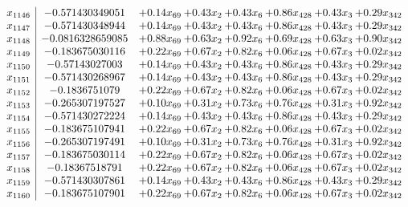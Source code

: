 \documentclass[8pt]{article}
\begin{document}
\[\begin{array}{c| c c@{\hskip 2pt} c@{\hskip 2pt} c@{\hskip 2pt} c@{\hskip 2pt} c@{\hskip 2pt} c@{\hskip 2pt} }
 x_{1146}   &  -0.571430349051 & +  0.14 x_{69} & +  0.43 x_{2} & +  0.43 x_{6} & +  0.86 x_{428} & +  0.43 x_{3} & +  0.29 x_{342}\\
 x_{1147}   &  -0.571430348944 & +  0.14 x_{69} & +  0.43 x_{2} & +  0.43 x_{6} & +  0.86 x_{428} & +  0.43 x_{3} & +  0.29 x_{342}\\
 x_{1148}   &  -0.0816328659085 & +  0.88 x_{69} & +  0.63 x_{2} & +  0.92 x_{6} & +  0.69 x_{428} & +  0.63 x_{3} & +  0.90 x_{342}\\
 x_{1149}   &  -0.183675030116 & +  0.22 x_{69} & +  0.67 x_{2} & +  0.82 x_{6} & +  0.06 x_{428} & +  0.67 x_{3} & +  0.02 x_{342}\\
 x_{1150}   &  -0.57143027003 & +  0.14 x_{69} & +  0.43 x_{2} & +  0.43 x_{6} & +  0.86 x_{428} & +  0.43 x_{3} & +  0.29 x_{342}\\
 x_{1151}   &  -0.571430268967 & +  0.14 x_{69} & +  0.43 x_{2} & +  0.43 x_{6} & +  0.86 x_{428} & +  0.43 x_{3} & +  0.29 x_{342}\\
 x_{1152}   &  -0.1836751079 & +  0.22 x_{69} & +  0.67 x_{2} & +  0.82 x_{6} & +  0.06 x_{428} & +  0.67 x_{3} & +  0.02 x_{342}\\
 x_{1153}   &  -0.265307197527 & +  0.10 x_{69} & +  0.31 x_{2} & +  0.73 x_{6} & +  0.76 x_{428} & +  0.31 x_{3} & +  0.92 x_{342}\\
 x_{1154}   &  -0.571430272224 & +  0.14 x_{69} & +  0.43 x_{2} & +  0.43 x_{6} & +  0.86 x_{428} & +  0.43 x_{3} & +  0.29 x_{342}\\
 x_{1155}   &  -0.183675107941 & +  0.22 x_{69} & +  0.67 x_{2} & +  0.82 x_{6} & +  0.06 x_{428} & +  0.67 x_{3} & +  0.02 x_{342}\\
 x_{1156}   &  -0.265307197491 & +  0.10 x_{69} & +  0.31 x_{2} & +  0.73 x_{6} & +  0.76 x_{428} & +  0.31 x_{3} & +  0.92 x_{342}\\
 x_{1157}   &  -0.183675030114 & +  0.22 x_{69} & +  0.67 x_{2} & +  0.82 x_{6} & +  0.06 x_{428} & +  0.67 x_{3} & +  0.02 x_{342}\\
 x_{1158}   &  -0.18367518791 & +  0.22 x_{69} & +  0.67 x_{2} & +  0.82 x_{6} & +  0.06 x_{428} & +  0.67 x_{3} & +  0.02 x_{342}\\
 x_{1159}   &  -0.571430307861 & +  0.14 x_{69} & +  0.43 x_{2} & +  0.43 x_{6} & +  0.86 x_{428} & +  0.43 x_{3} & +  0.29 x_{342}\\
 x_{1160}   &  -0.183675107901 & +  0.22 x_{69} & +  0.67 x_{2} & +  0.82 x_{6} & +  0.06 x_{428} & +  0.67 x_{3} & +  0.02 x_{342}\\

\end{array}\]
\end{document}

